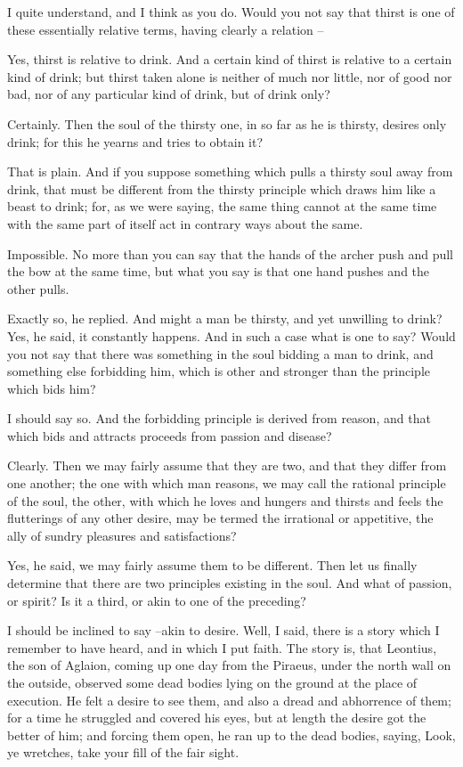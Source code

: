 I quite understand, and I think as you do.
Would you not say that thirst is one of these essentially relative terms, having clearly a relation --

Yes, thirst is relative to drink.
And a certain kind of thirst is relative to a certain kind of drink; but thirst taken alone is neither of much nor little, nor of good nor bad, nor of any particular kind of drink, but of drink only?

Certainly.
Then the soul of the thirsty one, in so far as he is thirsty, desires only drink; for this he yearns and tries to obtain it?

That is plain.
And if you suppose something which pulls a thirsty soul away from drink, that must be different from the thirsty principle which draws him like a beast to drink; for, as we were saying, the same thing cannot at the same time with the same part of itself act in contrary ways about the same.

Impossible.
No more than you can say that the hands of the archer push and pull the bow at the same time, but what you say is that one hand pushes and the other pulls.

Exactly so, he replied.
And might a man be thirsty, and yet unwilling to drink?
Yes, he said, it constantly happens.
And in such a case what is one to say? Would you not say that there was something in the soul bidding a man to drink, and something else forbidding him, which is other and stronger than the principle which bids him?

I should say so.
And the forbidding principle is derived from reason, and that which bids and attracts proceeds from passion and disease?

Clearly.
Then we may fairly assume that they are two, and that they differ from one another; the one with which man reasons, we may call the rational principle of the soul, the other, with which he loves and hungers and thirsts and feels the flutterings of any other desire, may be termed the irrational or appetitive, the ally of sundry pleasures and satisfactions?

Yes, he said, we may fairly assume them to be different.
Then let us finally determine that there are two principles existing in the soul. And what of passion, or spirit? Is it a third, or akin to one of the preceding?

I should be inclined to say --akin to desire.
Well, I said, there is a story which I remember to have heard, and in which I put faith. The story is, that Leontius, the son of Aglaion, coming up one day from the Piraeus, under the north wall on the outside, observed some dead bodies lying on the ground at the place of execution. He felt a desire to see them, and also a dread and abhorrence of them; for a time he struggled and covered his eyes, but at length the desire got the better of him; and forcing them open, he ran up to the dead bodies, saying, Look, ye wretches, take your fill of the fair sight.

